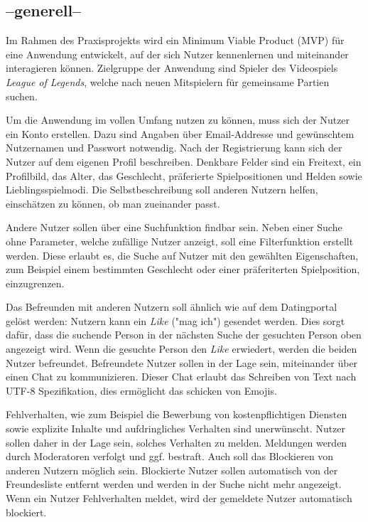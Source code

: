 \subsection{--generell--}
Im Rahmen des Praxisprojekts wird ein Minimum Viable Product
(MVP) %
für eine Anwendung entwickelt, auf der sich Nutzer kennenlernen und miteinander interagieren können. Zielgruppe der Anwendung sind Spieler des Videospiels \textit{League of Legends}, welche nach neuen Mitspielern für gemeinsame Partien suchen.

Um die Anwendung im vollen Umfang nutzen zu können, muss sich der Nutzer ein Konto erstellen.
Dazu sind Angaben über Email-Addresse und gewünschtem Nutzernamen und Passwort notwendig.
Nach der Registrierung kann sich der Nutzer auf dem eigenen Profil beschreiben.
Denkbare Felder sind ein Freitext, ein Profilbild, das Alter, das Geschlecht, präferierte Spielpositionen und Helden sowie Lieblingsspielmodi.
Die Selbstbeschreibung soll anderen Nutzern helfen, einschätzen zu können, ob man zueinander passt.

Andere Nutzer sollen über eine Suchfunktion findbar sein.
Neben einer Suche ohne Parameter, welche zufällige Nutzer anzeigt, soll eine Filterfunktion erstellt werden.
Diese erlaubt es, die Suche auf Nutzer mit den gewählten Eigenschaften, zum Beispiel einem bestimmten Geschlecht oder einer präferiterten Spielposition, einzugrenzen.

Das Befreunden mit anderen Nutzern soll ähnlich wie auf dem Datingportal  gelöst werden: Nutzern kann ein \textit{Like} ("mag ich") gesendet werden.
Dies sorgt dafür, dass die suchende Person in der nächsten Suche der gesuchten Person oben angezeigt wird.
Wenn die gesuchte Person den \textit{Like} erwiedert, werden die beiden Nutzer befreundet.
Befreundete Nutzer sollen in der Lage sein, miteinander über einen Chat zu kommunizieren.
Dieser Chat erlaubt das Schreiben von Text nach UTF-8 Spezifikation, %
dies ermöglicht das schicken von Emojis.

Fehlverhalten, wie zum Beispiel die Bewerbung von kostenpflichtigen Diensten sowie explizite Inhalte und aufdringliches Verhalten sind unerwünscht.
Nutzer sollen daher in der Lage sein, solches Verhalten zu melden.
Meldungen werden durch Moderatoren verfolgt und ggf. bestraft.
Auch soll das Blockieren von anderen Nutzern möglich sein.
Blockierte Nutzer sollen automatisch von der Freundesliste entfernt werden und werden in der Suche nicht mehr angezeigt.
Wenn ein Nutzer Fehlverhalten meldet, wird der gemeldete Nutzer automatisch blockiert.

